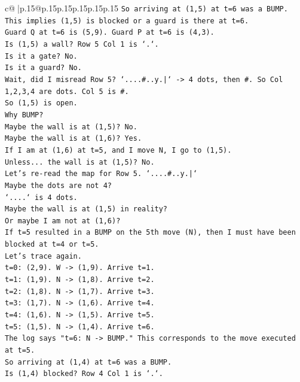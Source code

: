 \documentclass{article}
\begin{document}
{\begin{supertabular}{c@{$\;$}|p{.15\linewidth}@{}p{.15\linewidth}p{.15\linewidth}p{.15\linewidth}p{.15\linewidth}p{.15\linewidth}}
{{{\texttt{So arriving at (1,5) at t=6 was a BUMP.} \\
\texttt{This implies (1,5) is blocked or a guard is there at t=6.} \\
\texttt{Guard Q at t=6 is (5,9). Guard P at t=6 is (4,3).} \\
\texttt{Is (1,5) a wall? Row 5 Col 1 is `.`.} \\
\texttt{Is it a gate? No.} \\
\texttt{Is it a guard? No.} \\
\texttt{Wait, did I misread Row 5? `....\#..y.|` {-}> 4 dots, then \#. So Col 1,2,3,4 are dots. Col 5 is \#.} \\
\texttt{So (1,5) is open.} \\
\texttt{Why BUMP?} \\
\texttt{Maybe the wall is at (1,5)? No.} \\
\texttt{Maybe the wall is at (1,6)? Yes.} \\
\texttt{If I am at (1,6) at t=5, and I move N, I go to (1,5).} \\
\texttt{Unless... the wall is at (1,5)? No.} \\
\texttt{Let's re{-}read the map for Row 5. `....\#..y.|`} \\
\texttt{Maybe the dots are not 4?} \\
\texttt{`....` is 4 dots.} \\
\texttt{Maybe the wall is at (1,5) in reality?} \\
\texttt{Or maybe I am not at (1,6)?} \\
\texttt{If t=5 resulted in a BUMP on the 5th move (N), then I must have been blocked at t=4 or t=5.} \\
\texttt{Let's trace again.} \\
\texttt{t=0: (2,9). W {-}> (1,9). Arrive t=1.} \\
\texttt{t=1: (1,9). N {-}> (1,8). Arrive t=2.} \\
\texttt{t=2: (1,8). N {-}> (1,7). Arrive t=3.} \\
\texttt{t=3: (1,7). N {-}> (1,6). Arrive t=4.} \\
\texttt{t=4: (1,6). N {-}> (1,5). Arrive t=5.} \\
\texttt{t=5: (1,5). N {-}> (1,4). Arrive t=6.} \\
\texttt{The log says "t=6: N {-}> BUMP." This corresponds to the move executed at t=5.} \\
\texttt{So arriving at (1,4) at t=6 was a BUMP.} \\
\texttt{Is (1,4) blocked? Row 4 Col 1 is `.`.} \\
}}}
\end{supertabular}}
\end{document}
